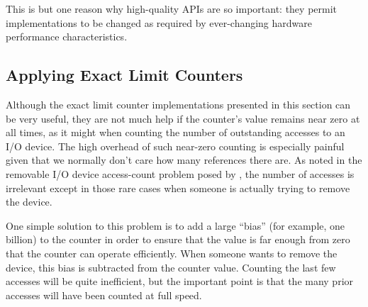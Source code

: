 \QuickQuizEnd

This is but one reason why high-quality APIs are so important:
they permit implementations to be changed as required by ever-changing
hardware performance characteristics.

\QuickQuizEnd

\subsection{Applying Exact Limit Counters}
\label{sec:count:Applying Exact Limit Counters}

Although the exact limit counter implementations presented in this
section can be very useful, they are not much help if the counter's value
remains near zero at all times, as it might when counting the number
of outstanding accesses to an I/O device.
The high overhead of such near-zero counting is especially painful
given that we normally don't care how many references there are.
As noted in the removable I/O device access-count problem posed by
\QuickQuizRef{\QcountQIOcnt},
the number of accesses is irrelevant except in those rare cases when
someone is actually trying to remove the device.

One simple solution to this problem is to add a large ``bias''
(for example, one billion) to the
counter in order to ensure that the value is far enough from zero that
the counter can operate efficiently.
When someone wants to remove the device, this bias is subtracted from
the counter value.
Counting the last few accesses will be quite inefficient,
but the important point is that the many prior accesses will have been
counted at full speed.


